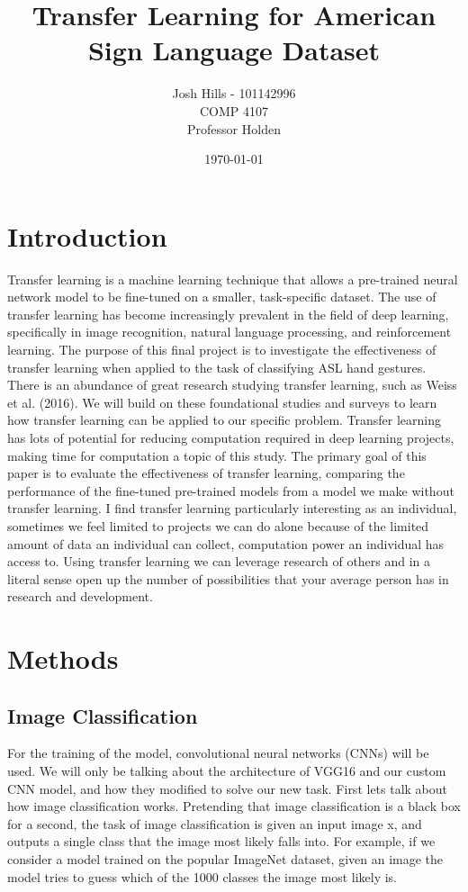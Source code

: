 \documentclass[12pt]{article}
\title{Transfer Learning for American Sign Language Dataset}
\author{Josh Hills - 101142996\\COMP 4107\\Professor Holden}
\date{\today}
\begin{document}
\maketitle
\newpage
\section{Introduction}
\quad
Transfer learning is a machine learning technique that allows a pre-trained neural network model to be fine-tuned on a smaller, task-specific dataset. The use of transfer learning has become 
increasingly prevalent in the field of deep learning, specifically in image recognition, natural language processing, and reinforcement learning. The purpose of this final project is to investigate
the effectiveness of transfer learning when applied to the task of classifying ASL hand gestures. There is an abundance of great research studying transfer learning, such as Weiss et al. (2016). We will
build on these foundational studies and surveys to learn how transfer learning can be applied to our specific problem. Transfer learning has lots of potential for reducing computation required in
deep learning projects, making time for computation a topic of this study. The primary goal of this paper is to evaluate the effectiveness of transfer learning, comparing the performance of the fine-tuned
pre-trained models from a model we make without transfer learning. I find transfer learning particularly interesting as an individual, sometimes we feel limited to projects we can do alone because of the 
limited amount of data an individual can collect, computation power an individual has access to. Using transfer learning we can leverage research of others and in a literal sense 
open up the number of possibilities that your average person has in research and development. 

\section{Methods}
\subsection{Image Classification}
\quad
For the training of the model, convolutional neural networks (CNNs) will be used. We will only be talking about the architecture of VGG16 and our custom CNN model, and how
they modified to solve our new task. First lets talk about how image classification works. Pretending that image classification is a black box for a second, the task of image classification is given
an input image x, and outputs a single class that the image most likely falls into. For example, if we consider a model trained on the popular ImageNet dataset, given an image the model tries to guess which of the
1000 classes the image most likely is. 
\end{document}
